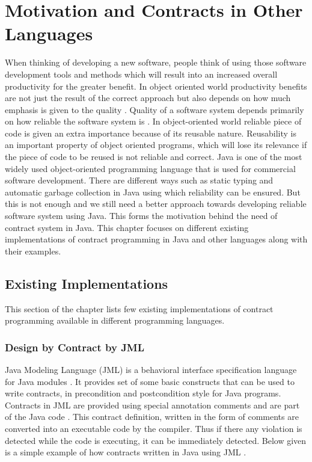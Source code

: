 \chapter{Motivation and Contracts in Other Languages}

When thinking of developing a new software, people think of using those software development tools and methods which will result into an increased overall productivity for the greater benefit. In object oriented world productivity benefits are not just the result of the correct approach but also depends on how much emphasis is given to the quality \cite{meyer1998building}.
Quality of a software system depends primarily on how reliable the software system is \cite{meyer1998building}. 
In object-oriented world reliable piece of code is given an extra importance because of its reusable nature. Reusability is an important property of object oriented programs, which will lose its relevance if the piece of code to be reused is not reliable and correct. 
Java is one of the most widely used object-oriented programming language that is used for commercial software development. There are different ways such as static typing and automatic garbage collection in Java using which reliability can be ensured. But this is not enough and we still need a better approach towards developing reliable software system using Java. This forms the motivation behind the need of contract system in Java.
This chapter focuses on different existing implementations of contract programming in Java and other languages along with their examples.

\section{Existing Implementations}

This section of the chapter lists few existing implementations of contract programming available in different programming languages. 

\subsection{Design by Contract by JML}
Java Modeling Language (JML) is a behavioral interface specification language for Java modules \cite{leavens2006design}. It provides set of some basic constructs that can be used to write contracts, in precondition and postcondition style for Java programs. Contracts in JML are provided using special annotation comments and are part of the Java code \cite{leavens2006design}. This contract definition, written in the form of comments  are converted into an executable code by the compiler. Thus if there any violation is detected while the code is executing, it can be immediately detected. 
Below given is a simple example of how contracts written in Java using JML \cite{JavaMode99:online}.
\linebreak

